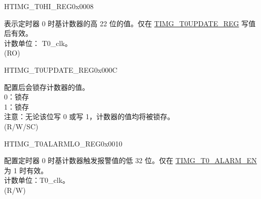 \begin{register}{H}{TIMG\_T0HI\_REG}{0x0008}\label{regdesc:TIMGTXHIREG}
%
%
\regnewline%
\begin{regdesc}\begin{reglist}
\label{fielddesc:TIMGTXHI}\item [TIMG\_T0\_HI] 表示定时器 0 时基计数器的高 22 位的值。仅在 \hyperref[regdesc:TIMGTXUPDATEREG]{TIMG\_T0UPDATE\_REG} 写值后有效。 \\
计数单位： T0\_clk。 \\ (RO)
\end{reglist}\end{regdesc}
\end{register}


\begin{register}{H}{TIMG\_T0UPDATE\_REG}{0x000C}\label{regdesc:TIMGTXUPDATEREG}
%
%
\regnewline%
\begin{regdesc}\begin{reglist}
\label{fielddesc:TIMGTXUPDATE}\item [TIMG\_T0\_UPDATE] 配置后会锁存计数器的值。 \\
0：锁存 \\
1：锁存 \\ 
注意：无论该位写 0 或写 1，计数器的值均将被锁存。\\ (R/W/SC)
\end{reglist}\end{regdesc}
\end{register}


\begin{register}{H}{TIMG\_T0ALARMLO\_REG}{0x0010}\label{regdesc:TIMGTXALARMLOREG}
%
\regnewline%
\begin{regdesc}\begin{reglist}
\label{fielddesc:TIMGTXALARMLO}\item [TIMG\_T0\_ALARM\_LO] 配置定时器 0 时基计数器触发报警值的低 32 位。仅在 \hyperref[fielddesc:TIMGTXALARMEN]{TIMG\_T0\_ALARM\_EN} 为 1 时有效。 \\
计数单位：T0\_clk。 \\ (R/W)
\end{reglist}\end{regdesc}
\end{register}


